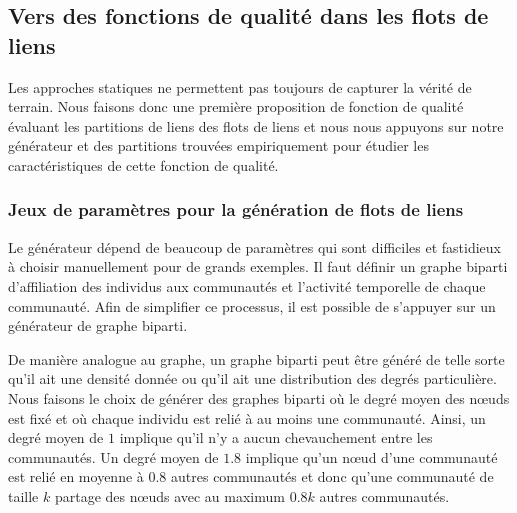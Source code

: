 
\subsection{Vers des fonctions de qualité dans les flots de liens}
\label{sec:versqualite_qualite}

Les approches statiques ne permettent pas toujours de capturer la vérité de terrain.
Nous faisons donc une première proposition de fonction de qualité évaluant les partitions de liens des flots de liens et nous nous appuyons sur notre générateur et des partitions trouvées empiriquement pour étudier les caractéristiques de cette fonction de qualité.





\subsubsection{Jeux de paramètres pour la génération de flots de liens}
\label{subsec:versqualite_qualite_param}
Le générateur dépend de beaucoup de paramètres qui sont difficiles et fastidieux à choisir manuellement pour de grands exemples.
Il faut définir un graphe biparti d'affiliation des individus aux communautés et l'activité temporelle de chaque communauté.
Afin de simplifier ce processus, il est possible de s'appuyer sur un générateur de graphe biparti.

De manière analogue au graphe, un graphe biparti peut être généré de telle sorte qu'il ait une densité donnée ou qu'il ait une distribution des degrés particulière.
Nous faisons le choix de générer des graphes biparti où le degré moyen des n\oe{}uds est fixé et où chaque individu est relié à au moins une communauté.
Ainsi, un degré moyen de $1$ implique qu'il n'y a aucun chevauchement entre les communautés.
Un degré moyen de $1.8$ implique qu'un n\oe{}ud d'une communauté est relié en moyenne à $0.8$ autres communautés et donc qu'une communauté de taille $k$ partage des n\oe{}uds avec au maximum $0.8k$ autres communautés.

